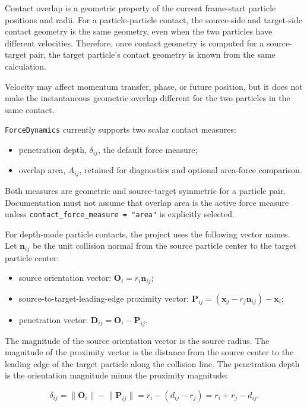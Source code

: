 Contact overlap is a geometric property of the current frame-start particle
positions and radii.  For a particle-particle contact, the source-side and
target-side contact geometry is the same geometry, even when the two particles
have different velocities.  Therefore, once contact geometry is computed for a
source-target pair, the target particle's contact geometry is known from the
same calculation.

Velocity may affect momentum transfer, phase, or future position, but it does
not make the instantaneous geometric overlap different for the two particles in
the same contact.

\texttt{ForceDynamics} currently supports two scalar contact measures:

\begin{itemize}
    \item penetration depth, \(\delta_{ij}\), the default force measure;
    \item overlap area, \(A_{ij}\), retained for diagnostics and optional
    area-force comparison.
\end{itemize}

Both measures are geometric and source-target symmetric for a particle pair.
Documentation must not assume that overlap area is the active force measure
unless \texttt{contact\_force\_measure = "area"} is explicitly selected.

For depth-mode particle contacts, the project uses the following vector names.
Let \(\mathbf n_{ij}\) be the unit collision normal from the source particle
center to the target particle center:

\begin{itemize}
    \item source orientation vector:
    \(\mathbf O_i = r_i\mathbf n_{ij}\);
    \item source-to-target-leading-edge proximity vector:
    \(\mathbf P_{ij}=(\mathbf x_j-r_j\mathbf n_{ij})-\mathbf x_i\);
    \item penetration vector:
    \(\mathbf D_{ij}=\mathbf O_i-\mathbf P_{ij}\).
\end{itemize}

The magnitude of the source orientation vector is the source radius.  The
magnitude of the proximity vector is the distance from the source center to the
leading edge of the target particle along the collision line.  The penetration
depth is the orientation magnitude minus the proximity magnitude:

\begin{equation}
\delta_{ij}=\lVert\mathbf O_i\rVert-\lVert\mathbf P_{ij}\rVert
=r_i-(d_{ij}-r_j)=r_i+r_j-d_{ij}.
\end{equation}

